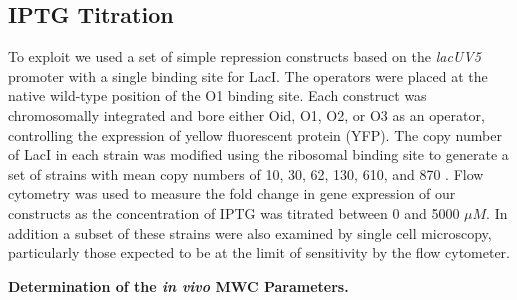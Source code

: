 \pagebreak
\subsection*{IPTG Titration}


To exploit \eref[eq7] we used a set of simple repression constructs based on the
\textit{lacUV5} promoter with a single binding site for LacI. The
operators were placed at the native wild-type position of the O1 binding site.
Each construct was chromosomally integrated and bore either Oid, O1, O2, or O3
as an operator, controlling the expression of yellow fluorescent protein (YFP).
The copy number of LacI in each strain was modified using the ribosomal
binding site to generate a set of strains with mean copy numbers of 10, 30, 62,
130, 610, and 870 \cite{Garcia2011}. Flow cytometry was used
to measure the fold change in gene expression of our constructs as the
concentration of IPTG was titrated between 0 and 5000 $\mu M$. In addition a
subset of these strains were also examined by single cell microscopy,
particularly those expected to be at the limit of sensitivity by the flow
cytometer. 

\noindent \textbf{Determination of the \textit{in vivo} MWC Parameters.}

